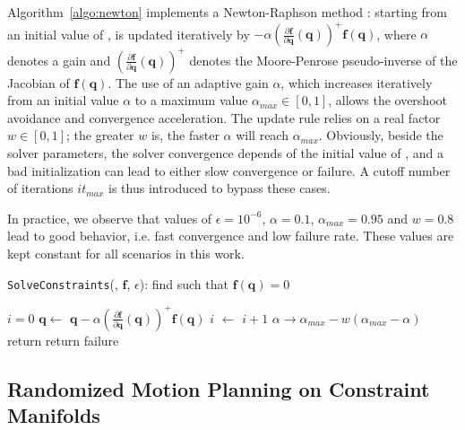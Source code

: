 Algorithm~\ref{algo:newton} implements a Newton-Raphson method
\cite{bonnans2006numerical}: starting from an initial value of
\config{}, \config{} is updated iteratively by $- \alpha
\left(\frac{\partial \mathbf{f}}{\partial
  \mathbf{q}}(\mathbf{q})\right)^{+} \mathbf{f}(\mathbf{q})$, where
$\alpha$ denotes a gain and $\left(\frac{\partial \mathbf{f}}{\partial
  \mathbf{q}}(\mathbf{q})\right)^{+}$ denotes the Moore-Penrose
pseudo-inverse of the Jacobian of $\mathbf{f}(\mathbf{q})$. The use of
an adaptive gain $\alpha$, which increases iteratively from an initial
value $\alpha$ to a maximum value $\alpha_{max}\in[0,1]$, allows the
overshoot avoidance and convergence acceleration. The update rule
relies on a real factor $w \in [0,1]$; the greater $w$ is, the faster
$\alpha$ will reach $\alpha_{max}$. Obviously, beside the solver
parameters, the solver convergence depends of the initial value of
\config{}, and a bad initialization can lead to either slow
convergence or failure. A cutoff number of iterations $it_{max}$ is
thus introduced to bypass these cases.

In practice, we observe that values of $\epsilon=10^{-6}$,
$\alpha=0.1$, $\alpha_{max}=0.95$ and $w=0.8$ lead to good behavior,
i.e. fast convergence and low failure rate. These values are kept
constant for all scenarios in this work.

\begin{algorithm}
\caption{\texttt{SolveConstraints}(\config{}, $\mathbf{f}$, $\epsilon$): find
  \config{} such that $\mathbf{f}(\mathbf{q}) = 0$}
\label{algo:newton}
\begin{algorithmic}
\STATE $i=0$
\STATE $\mathbf{q} \leftarrow$ $\mathbf{q} - \alpha \left(\frac{\partial \mathbf{f}}{\partial \mathbf{q}}(\mathbf{q})\right)^{+} \mathbf{f}(\mathbf{q})$
\STATE $i$ $\leftarrow$ $i+1$
\STATE $\alpha \rightarrow \alpha_{max} - w(\alpha_{max} - \alpha)$
\ENDWHILE
{}
\STATE return \config{}
\ELSE
\STATE return failure
\ENDIF
\end{algorithmic}
\end{algorithm}

\subsection{Randomized Motion Planning on Constraint Manifolds}
\label{subsec:chap2-constraint-motion-planning}

